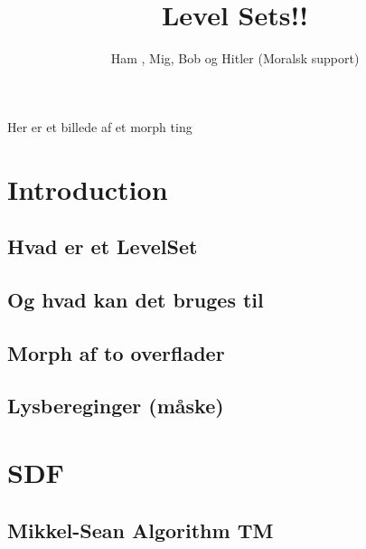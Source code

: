 \documentclass[a4paper]{memoir}
\title{Level Sets!!}
\author{Ham , Mig, Bob og Hitler (Moralsk support)}
\begin{document}
\maketitle{}

Her er et billede af et morph ting

\begin{comment}
|----------------------------+----------+--------|
| Afsnit                     | Indhold  | Hvem   |
|----------------------------+----------+--------|
| Intro                      | ch. 1,2  | have   |
| Build SDF / Discretization | artikel? | vester |
| Reinitialize               | ch. 7    | cpvc   |
| Motion                     | ch. 4,6  | ptx    |
| Externally gen. vf.        | ch. 3    | geggie |
| Godunov                    | ch. 5    | cpvc   |
|----------------------------+----------+--------|
\end{comment}

\newpage

\tableofcontents{}

\chapter{Introduction}

\section{Hvad er et LevelSet}
\section{Og hvad kan det bruges til}

\section{Morph af to overflader}
\section{Lysbereginger (måske)}

\chapter{SDF}

\section{Mikkel-Sean Algorithm TM}
\end{document}
